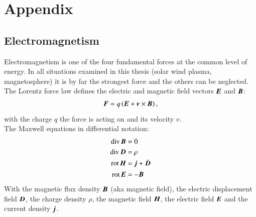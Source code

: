 
\chapter{Appendix}
\label{chap:appendix}


\section{Electromagnetism}	%
Electromagnetism is one of the four fundamental forces at the common level of energy. In all situations examined in this thesis (solar wind plasma, magnetosphere) it is by far the strongest force and the others can be neglected.\\

The Lorentz force law defines the electric and magnetic field vectors $\boldsymbol{E}$ and $\boldsymbol{B}$:
\begin{align}
	\boldsymbol{F} = q\,(\boldsymbol{E} + \boldsymbol{v} \times \boldsymbol{B})	\,,
\end{align}
with the charge $q$ the force is acting on and its velocity $v$.\\

The Maxwell equations in differential notation:
\begin{align}
	\text{div}\,\boldsymbol{B} &= 0\\
	\text{div}\,\boldsymbol{D} &= \rho\\
	\text{rot}\,\boldsymbol{H} &= \boldsymbol{j} + \dot{\boldsymbol{D}}\\
	\text{rot}\,\boldsymbol{E} &= - \dot{\boldsymbol{B}}
\end{align}
With the magnetic flux density $\boldsymbol{B}$ (aka magnetic field), the electric displacement field $\boldsymbol{D}$, the charge density $\rho$, the magnetic field $\boldsymbol{H}$, the electric field $\boldsymbol{E}$ and the current density $\boldsymbol{j}$.\\


